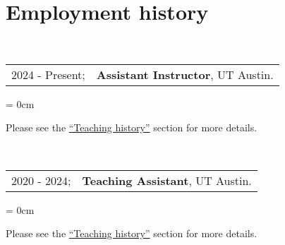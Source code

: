 \documentclass[a4paper, 10pt]{article}
\begin{document}
  \section{Employment history}
  ~\begin{tabular}{ll}
    2024 - Present; & \textbf{Assistant Instructor}, UT Austin.
  \end{tabular}
  \begin{compactitem}\parskip = 0cm
    \item Please see the {\hypersetup{linkcolor = black}\hyperref[sec:teaching_history]{``Teaching history''}} section for more details.
  \end{compactitem}
  \vspace*{1.25em}
  
  ~\begin{tabular}{ll}
    2020 - 2024; & \textbf{Teaching Assistant}, UT Austin.
  \end{tabular}
  \begin{compactitem}\parskip = 0cm
    \item Please see the {\hypersetup{linkcolor = black}\hyperref[sec:teaching_history]{``Teaching history''}} section for more details.
  \end{compactitem}
  \vspace*{1.25em}
\end{document}

